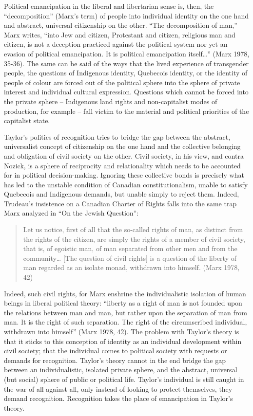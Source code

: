 \documentclass[12pt,oneside]{memoir}
\begin{document}
	Political emancipation in the liberal and libertarian sense is, then, the ``decomposition'' (Marx's term) of people into individual identity on the one hand and abstract, universal citizenship on the other. ``The decomposition of man,'' Marx writes, ``into Jew and citizen, Protestant and citizen, religious man and citizen, is not a deception practiced against the political system nor yet an evasion of political emancipation. It is political emancipation itself{\ldots}'' (Marx 1978, 35-36). The same can be said of the ways that the lived experience of transgender people, the questions of Indigenous identity, Quebecois identity, or the identity of people of colour are forced out of the political sphere into the sphere of private interest and individual cultural expression. Questions which cannot be forced into the private sphere -- Indigenous land rights and non-capitalist modes of production, for example -- fall victim to the material and political priorities of the capitalist state.
	
	Taylor's politics of recognition tries to bridge the gap between the abstract, universalist concept of citizenship on the one hand and the collective belonging and obligation of civil society on the other. Civil society, in his view, and contra Nozick, is a sphere of reciprocity and relationality which needs to be accounted for in political decision-making. Ignoring these collective bonds is precisely what has led to the unstable condition of Canadian constitutionalism, unable to satisfy Quebecois and Indigenous demands, but unable simply to reject them.
	Indeed, Trudeau's insistence on a Canadian Charter of Rights falls into the same trap Marx analyzed in ``On the Jewish Question'':

\begin{quote}
Let us notice, first of all that the so-called rights of man, as distinct from the rights of the citizen, are simply the rights of a member of civil society, that is, of egoistic man, of man separated from other men and from the community{\ldots} [The question of civil rights] is a question of the liberty of man regarded as an isolate monad, withdrawn into himself. (Marx 1978, 42)
\end{quote}

Indeed, such civil rights, for Marx enshrine the individualistic isolation of human beings in liberal political theory: ``liberty as a right of man is not founded upon the relations between man and man, but rather upon the separation of man from man. It is the right of such separation. The right of the circumscribed individual, withdrawn into himself'' (Marx 1978, 42). The problem with Taylor's theory is that it sticks to this conception of identity as an individual development within civil society; that the individual comes to political society with requests or demands for recognition. Taylor's theory cannot in the end bridge the gap between an individualistic, isolated private sphere, and the abstract, universal (but social) sphere of public or political life. Taylor's individual is still caught in the war of all against all, only instead of looking to protect themselves, they demand recognition. Recognition takes the place of emancipation in Taylor's theory.
\end{document}
